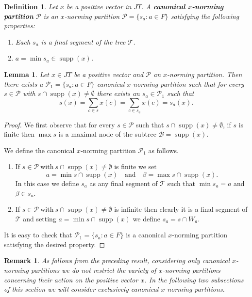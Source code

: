 \documentclass[11pt,a4paper]{amsart}
\newtheorem{lemma}[theorem]{Lemma}
\newtheorem{definition}[theorem]{Definition}
\newtheorem{remark}[theorem]{Remark}
\newcommand{\JT}{JT}
\newcommand{\Tree}{\mathcal{T}}
\newcommand{\supp}{\operatorname{supp}}
\begin{document}
  \begin{definition}
    Let $x$ be a positive vector in $\JT$. A \textbf{canonical $x$-norming partition} $\mathcal{P}$ is an $x$-norming partition $\mathcal{P} = \{s_a: a\in F\}$ satisfying the following properties:
  \begin{enumerate}
  \item Each $s_a$ is a final segment of the tree $\Tree$.
  \item $a = \min s_a \in \supp(x)$.
  \end{enumerate}
  \end{definition}

  \begin{lemma}
    Let $x\in \JT$ be a positive vector and $\mathcal{P}$ an $x$-norming partition. Then there exists a 
  $\mathcal{P}_1 = \{ s_a: a \in F\}$ canonical $x$-norming partition such that for every $s \in \mathcal{P}$ with
    $s \cap \supp(x) \ne \emptyset$ there exists an $s_a \in \mathcal{P}_1$ such that 
         \[ s(x) = \sum_{c\in s} x(c) = \sum_{c\in s_a} x(c) = s_a(x). \]
  \end{lemma}      
    \begin{proof}
      We first observe that for every $s\in \mathcal{P}$ such that $s \cap \supp(x) \ne \emptyset$, if $s$ is finite then $\max s$ is a maximal node of the subtree $\mathcal{B}= \supp(x)$.
    
    We define the canonical $x$-norming partition $\mathcal{P}_1$ as follows.
    \begin{enumerate}
    \item If $s\in \mathcal{P} \: \text{with} \: s\cap \supp(x) \ne \emptyset $ is finite we set
     \[ a =\min s\cap \supp(x) \quad \text{and} \quad  \beta = \max s\cap \supp(x). \] 
     In this case we define $s_a$ as any final segment of $\Tree$ such that $\min s_a = a $ and $\beta \in s_a$.
    \item If $s\in \mathcal{P} \: \text{with} \: s\cap \supp(x) \ne \emptyset $ is infinite then clearly it is a final segment of $\Tree$ and setting $a = \min s\cap \supp(x)$ we define $s_a = s\cap W_a$.
    \end{enumerate}
     It is easy to check that $\mathcal{P}_1 = \{ s_a : a \in F\}$ is a canonical $x$-norming partition satisfying the desired property.
    \end{proof}

  \begin{remark}
    As follows from the preceding result, considering only canonical $x$-norming partitions we do not restrict the variety of $x$-norming partitions concerning their action on the positive vector $x$. In the following two subsections of this section we will consider exclusively canonical $x$-norming partitions.
  \end{remark}
\end{document}
